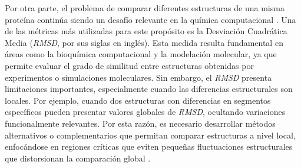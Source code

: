 Por otra parte, el problema de comparar diferentes estructuras de una misma prote\'{i}na contin\'{u}a siendo un desaf\'{i}o relevante en la qu\'{i}mica computacional \cite{Kufareva2012}. Una de las m\'{e}tricas m\'{a}s utilizadas para este prop\'{o}sito es la Desviaci\'{o}n Cuadr\'{a}tica Media (\textit{RMSD}, por sus siglas en ingl\'{e}s). Esta medida resulta fundamental en \'{a}reas como la bioqu\'{i}mica computacional y la modelaci\'{o}n molecular, ya que permite evaluar el grado de similitud entre estructuras obtenidas por experimentos o simulaciones moleculares. Sin embargo, el \textit{RMSD} presenta limitaciones importantes, especialmente cuando las diferencias estructurales son locales. Por ejemplo, cuando dos estructuras con diferencias en segmentos espec\'{i}ficos pueden presentar valores globales de \textit{RMSD}, ocultando variaciones funcionalmente relevantes. Por esta raz\'{o}n, es necesario desarrollar m\'{e}todos alternativos o complementarios que permitan comparar estructuras a nivel local, enfoc\'{a}ndose en regiones cr\'{i}ticas que eviten pequeñas fluctuaciones estructurales que distorsionan la comparaci\'{o}n global \cite{Kufareva2012}.\\


